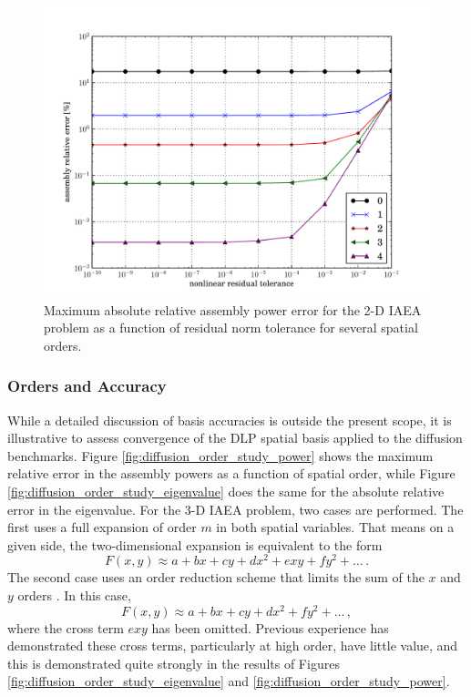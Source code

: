 \begin{figure}[ht]
    \centering
    \includegraphics[keepaspectratio, width = 3.5 in]
                    {tolerance_study_power}
    \caption{Maximum absolute relative assembly power error for the 2-D IAEA 
             problem as a function of 
             residual norm tolerance for several spatial orders.}
    \label{fig:tolerance_study_power}
\end{figure}

\subsubsection{Orders and Accuracy}
\label{sec:diffusion_order_accuracy}

While a detailed discussion of basis accuracies is outside the 
present scope, it is illustrative to assess convergence 
of the DLP spatial basis applied to the diffusion benchmarks.  
Figure \ref{fig:diffusion_order_study_power}
 shows the maximum relative error in the assembly 
powers as a function of spatial order, while Figure 
\ref{fig:diffusion_order_study_eigenvalue} does 
the same for the absolute relative error in the eigenvalue.  For the 
3-D IAEA problem, two cases are performed.  The first uses a full 
expansion of order $m$ in both spatial variables.  That means on a given 
side, the two-dimensional expansion is equivalent to the form 
\begin{equation}
 F(x, y) \approx a + bx + cy + d x^2 + e xy + f y^2 + \ldots \, .
\end{equation}
The second case uses an order reduction scheme that 
limits the sum of the $x$ and $y$ orders \cite{forget2006tdh}.  In this case,
\begin{equation}
 F(x, y) \approx a + bx + cy + d x^2 + f y^2 + \ldots \, ,
\end{equation}
where the cross term $e xy$ has been omitted.  Previous experience 
has demonstrated these cross terms, particularly at high order, have 
little value, and this is demonstrated quite strongly in the results
of Figures \ref{fig:diffusion_order_study_eigenvalue} 
and \ref{fig:diffusion_order_study_power}.

